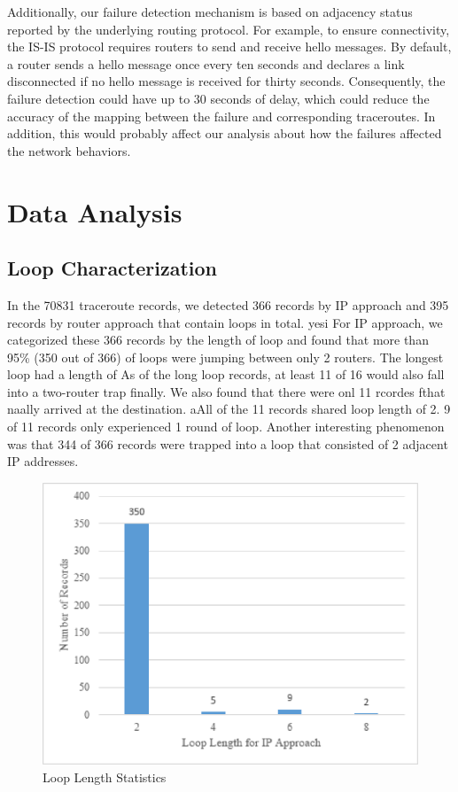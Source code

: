 \documentclass[conference, twocolumn, oneside, 10pt]{IEEEtran}
\begin{document}
Additionally, our failure detection mechanism is based on adjacency status reported by the underlying routing protocol. For example, to ensure connectivity, the IS-IS protocol requires routers to send and
receive hello messages. By default, a router sends a hello message once every ten seconds and declares a link disconnected if no hello message is received for thirty seconds. Consequently, the failure detection could have up to 30 seconds of delay, which could reduce the accuracy of the mapping between the failure and corresponding traceroutes. In addition, this would probably affect our analysis about how the failures affected the network behaviors.

\section{Data Analysis}
\label{sec:sec6}

\subsection{Loop Characterization}
 
In the 70831 traceroute records, we detected 366 records by IP approach and 395 records by router approach that contain loops in total. 
yesi
For IP approach, we categorized these 366 records by the length of loop and found that more than 95\% (350 out of 366) of loops were jumping between only 2 routers. The longest loop had a length of As of the long loop records, at least 11 of 16 would also fall into a two-router trap finally. We also found that there were onl 11 rcordes fthat naally arrived at the destination. aAll of the 11 records shared loop length of 2. 9 of 11 records only experienced 1 round of loop. Another interesting phenomenon was that 344 of 366 records were trapped into a loop that consisted of 2 adjacent IP addresses.

\begin{figure}[h!]
\centering
\includegraphics[scale=0.4]{plot/loop_length1.eps}
\caption{Loop Length Statistics}
\label{fig:asdf}
\end{figure}
\end{document}

